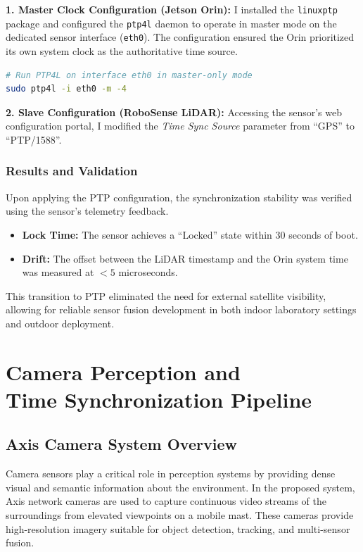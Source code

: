\documentclass[12pt,a4paper]{report}
\begin{document}
\textbf{1. Master Clock Configuration (Jetson Orin):}
I installed the \texttt{linuxptp} package and configured the \texttt{ptp4l} daemon to operate in master mode on the dedicated sensor interface (\texttt{eth0}). The configuration ensured the Orin prioritized its own system clock as the authoritative time source.

\begin{lstlisting}[language=bash, caption={Launching PTP4L in Master Mode}]
# Run PTP4L on interface eth0 in master-only mode
sudo ptp4l -i eth0 -m -4
\end{lstlisting}

\textbf{2. Slave Configuration (RoboSense LiDAR):}
Accessing the sensor's web configuration portal, I modified the \textit{Time Sync Source} parameter from ``GPS'' to ``PTP/1588''.

\subsection{Results and Validation}
Upon applying the PTP configuration, the synchronization stability was verified using the sensor's telemetry feedback.
\begin{itemize}
    \item \textbf{Lock Time:} The sensor achieves a ``Locked'' state within 30 seconds of boot.
    \item \textbf{Drift:} The offset between the LiDAR timestamp and the Orin system time was measured at $< 5$ microseconds.
\end{itemize}

This transition to PTP eliminated the need for external satellite visibility, allowing for reliable sensor fusion development in both indoor laboratory settings and outdoor deployment.

\chapter[Camera Perception Pipeline]{Camera Perception and \\ Time Synchronization Pipeline}

\section{Axis Camera System Overview}
Camera sensors play a critical role in perception systems by providing dense visual and semantic information about the environment. In the proposed system, Axis network cameras are used to capture continuous video streams of the surroundings from elevated viewpoints on a mobile mast. These cameras provide high-resolution imagery suitable for object detection, tracking, and multi-sensor fusion.
\end{document}
